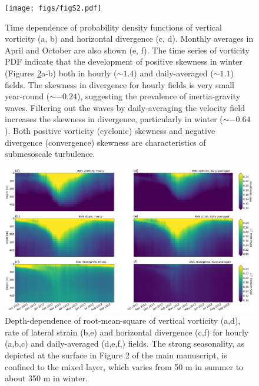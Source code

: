 \documentclass[draft,grl]{agutexSI}
\begin{document}
 \begin{figure}
    \begin{center}
      \texttt{[image: figs/figS2.pdf]}
   \caption{Time dependence of probability density functions of vertical vorticity (a, b)
   and horizontal divergence (c, d). Monthly averages in April and October are
   also shown (e, f). The time series of vorticity PDF indicate that
   the development of positive skewness in winter (Figures \ref{figS2_2}a-b) both in
   hourly ($\sim 1.4$) and daily-averaged ($\sim1.1$) fields. The skewness
   in divergence for hourly fields is very small year-round ($\sim -0.24$), suggesting the
   prevalence of inertia-gravity waves. Filtering out the waves by daily-averaging
   the velocity field increases the skewness in divergence, particularly in winter ($\sim-0.64$). Both
  positive vorticity (cyclonic) skewness and negative divergence (convergence) skewness
  are characteristics of submesoscale turbulence.}
   \label{figS2_2}
   \end{center}
 \end{figure}

 \begin{figure}
    \begin{center}
      \includegraphics[width=40pc]{figs/figS3.png}
   \caption{Depth-dependence of root-mean-square of vertical vorticity (a,d), rate of lateral strain (b,e)
   and horizontal divergence (c,f) for hourly (a,b,c) and daily-averaged (d,e,f,) fields.
   The strong seasonality, as depicted
   at the surface in Figure 2 of the main manuscript, is confined to the mixed layer, which
   varies from 50 m in summer to about 350 m in winter.}
   \label{figS2_2}
   \end{center}
 \end{figure}
\end{document}
